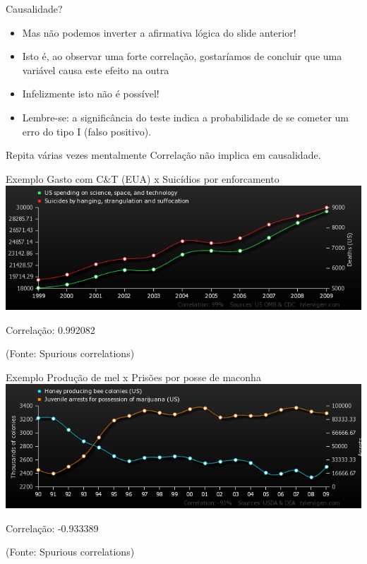 \documentclass{beamer}
\begin{document}
\begin{frame}{Causalidade?}
  \begin{itemize}
  \item Mas não podemos inverter a afirmativa lógica do slide
    anterior!
  \item Isto é, ao observar uma forte correlação, gostaríamos de
    concluir que uma variável \alert{causa} este efeito na outra
  \item Infelizmente isto não é possível!
  \item Lembre-se: a significância do teste indica a probabilidade de
    se cometer um erro do tipo I (falso positivo).
  \end{itemize}
  \begin{block}{Repita várias vezes mentalmente}
    Correlação não implica em causalidade.
  \end{block}
\end{frame}


\begin{frame}{Exemplo}
  Gasto com C\&T (EUA) x Suicídios por enforcamento
  \includegraphics[width=\textwidth]{Cap17/us-spending-on-science-space-and-technology_suicides-by-hanging-strangulation-and-suffocation}

  Correlação: 0.992082

  (Fonte: Spurious correlations)
\end{frame}

\begin{frame}{Exemplo}
  Produção de mel x Prisões por posse de maconha
  \includegraphics[width=\textwidth]{Cap17/honey-producing-bee-colonies-us_juvenile-arrests-for-possession-of-marijuana-us}

  Correlação: -0.933389

  (Fonte: Spurious correlations)
\end{frame}
\end{document}
